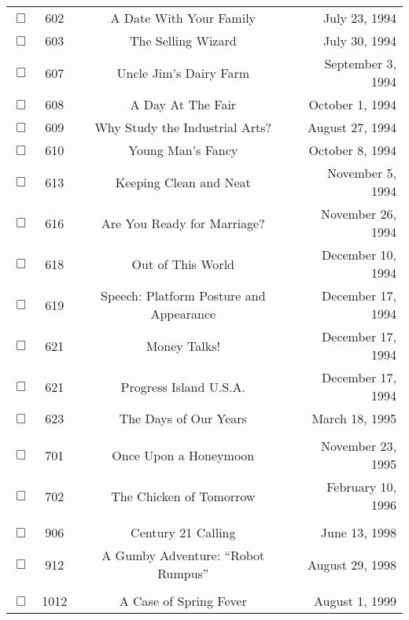 \documentclass[12pt]{article}
\begin{document}
\begin{center}
\begin{longtable}[c]{cccr}
\\  %
$\Box$&602&A Date With Your Family&July 23, 1994\\
$\Box$&603&The Selling Wizard&July 30, 1994\\
$\Box$&607&Uncle Jim's Dairy Farm&September 3, 1994\\
$\Box$&608&A Day At The Fair&October 1, 1994\\
$\Box$&609&Why Study the Industrial Arts?&August 27, 1994\\
$\Box$&610&Young Man's Fancy&October 8, 1994\\
$\Box$&613&Keeping Clean and Neat&November 5, 1994\\
$\Box$&616&Are You Ready for Marriage?&November 26, 1994\\
$\Box$&618&Out of This World&December 10, 1994\\
$\Box$&619&Speech: Platform Posture and Appearance&December 17, 1994\\
$\Box$&621&Money Talks!&December 17, 1994\\
$\Box$&621&Progress Island U.S.A.&December 17, 1994\\
$\Box$&623&The Days of Our Years&March 18, 1995\\

\\  %
$\Box$&701&Once Upon a Honeymoon&November 23, 1995\\
$\Box$&702&The Chicken of Tomorrow&February 10, 1996\\


\\  %
$\Box$&906&Century 21 Calling&June 13, 1998\\
$\Box$&912&A Gumby Adventure: ``Robot Rumpus''&August 29, 1998\\

\\  %
$\Box$&1012&A Case of Spring Fever&August 1, 1999\\



\end{longtable}
\end{center}
\end{document}
